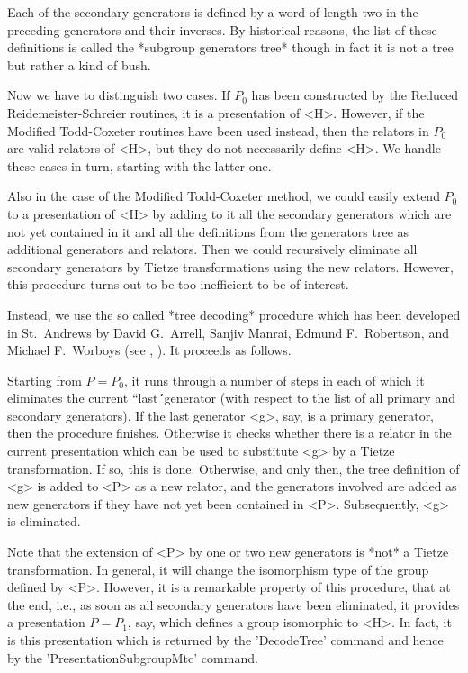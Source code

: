 Each of  the secondary generators is defined  by a  word of length two in
the preceding  generators and their inverses.  By historical reasons, the
list  of these  definitions is  called  the  *subgroup  generators  tree*
though in fact it is not a tree but rather a kind of bush.%

Now we have to distinguish two cases.  If  $P_0$ has been constructed  by
the Reduced Rei\-de\-mei\-ster-Schreier routines, it is a presentation of
<H>.   However, if  the Modified Todd-Coxeter  routines  have  been  used
instead, then  the relators in $P_0$ are valid relators  of <H>, but they
do not necessarily  define <H>.  We handle these cases in turn,  starting
with the latter one.

Also in the  case  of the Modified Todd-Coxeter method,  we could  easily
extend  $P_0$ to a presentation of <H> by adding to it  all the secondary
generators which are not yet contained in it and all the definitions from
the generators tree as additional generators and relators.  Then we could
recursively eliminate all secondary generators by Tietze  transformations
using the  new relators.  However,  this  procedure  turns out to  be too
inefficient to be of interest.

Instead, we  use the  so called *tree decoding* procedure which  has been
developed  in  St.~Andrews by  David  G.~Arrell,  Sanjiv  Manrai,  Edmund
F.~Robertson, and Michael F.~Wor\-boys  (see \cite{AMW82},  \cite{AR84}).
It proceeds as follows.

Starting from  $P = P_0$, it  runs through a  number of steps  in each of
which it  eliminates the current ``last\'\'\  generator  (with respect to
the list of all primary and secondary generators).  If the last generator
<g>, say, is a primary generator, then the procedure finishes.  Otherwise
it checks  whether there is a relator  in the current  presentation which
can be used to substitute <g> by a Tietze transformation.  If so, this is
done.  Otherwise, and only then, the  tree definition of  <g> is added to
<P> as  a  new relator,  and  the generators involved   are added as  new
generators if they have not yet been contained in <P>.  Subsequently, <g>
is eliminated.

Note that the extension of <P> by  one or two new  generators is *not*  a
Tietze  transformation.  In general, it will change the  isomorphism type
of the group  defined by  <P>.  However,  it is a remarkable  property of
this  procedure, that  at  the  end,  i.e.,  as  soon  as  all  secondary
generators have been eliminated, it  provides a  presentation  $P = P_1$,
say, which defines  a  group  isomorphic to <H>.   In  fact,  it is  this
presentation  which is returned by  the 'DecodeTree' command and hence by
the 'PresentationSubgroupMtc' command.

